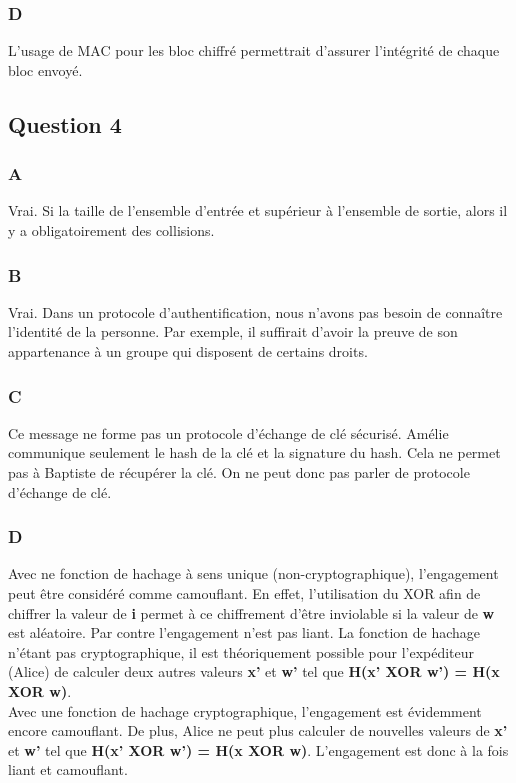 \documentclass[a4paper, 11pt, oneside]{article}
\begin{document}
\subsubsection{D}

L'usage de MAC pour les bloc chiffré permettrait d'assurer l'intégrité de chaque bloc envoyé.

\subsection{Question 4}

\subsubsection{A}

Vrai. Si la taille de l’ensemble d'entrée et supérieur à l'ensemble de sortie, alors il y a obligatoirement des collisions. 

\subsubsection{B}

Vrai. Dans un protocole d’authentification, nous n'avons pas besoin de connaître l'identité de la personne. Par exemple, il suffirait d'avoir la preuve de son appartenance à un groupe qui disposent de certains droits. 

\subsubsection{C}

Ce message ne forme pas un protocole d'échange de clé sécurisé. Amélie communique seulement le hash de la clé et la signature du hash. Cela ne permet pas à Baptiste de récupérer la clé. On ne peut donc pas parler de protocole d'échange de clé.

\subsubsection{D}

Avec ne fonction de hachage à sens unique (non-cryptographique), l'engagement peut être considéré comme camouflant. En effet, l'utilisation du XOR afin de chiffrer la valeur de \textbf{i} permet à ce chiffrement d'être inviolable si la valeur de \textbf{w} est aléatoire.
Par contre l'engagement n'est pas liant. La fonction de hachage n'étant pas cryptographique, il est théoriquement possible pour l’expéditeur (Alice) de calculer deux autres valeurs \textbf{x'} et \textbf{w'} tel que \textbf{H(x' XOR w') = H(x XOR w)}. 
\\[5pt]
Avec une fonction de hachage cryptographique, l'engagement est évidemment encore camouflant. De plus, Alice ne peut plus calculer de nouvelles valeurs de \textbf{x'} et \textbf{w'} tel que \textbf{H(x' XOR w') = H(x XOR w)}. L'engagement est donc à la fois liant et camouflant.
\end{document}
